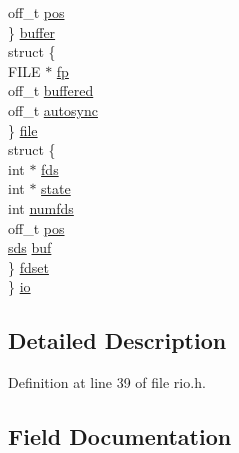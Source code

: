 \begin{DoxyCompactItemize}
\begin{tabbing}
\>\>off\_t \hyperlink{struct__rio_a320b91e58d067b5097a431e6da94f247}{pos}\\
\>\} \hyperlink{struct__rio_a08fd4992ea2a6cc4f1cae2d22475e950}{buffer}\\
\>struct \{\\
\>\>FILE $\ast$ \hyperlink{struct__rio_aa065f30aa9f5f9a42132c82c787ee70b}{fp}\\
\>\>off\_t \hyperlink{struct__rio_aaf9c739870ce662f03414e87c0a3947b}{buffered}\\
\>\>off\_t \hyperlink{struct__rio_a26ab7c3adc5a936bacbe48d501c163f2}{autosync}\\
\>\} \hyperlink{struct__rio_abc0d7429e6b98d70aadb166991f8e5e3}{file}\\
\>struct \{\\
\>\>int $\ast$ \hyperlink{struct__rio_ad259456372b9b7ad374dccd9d0f80eac}{fds}\\
\>\>int $\ast$ \hyperlink{struct__rio_ace50bce9d6e7ed2958418778a6b1711f}{state}\\
\>\>int \hyperlink{struct__rio_a01ef09680a9926f281067248a833e69b}{numfds}\\
\>\>off\_t \hyperlink{struct__rio_a320b91e58d067b5097a431e6da94f247}{pos}\\
\>\>\hyperlink{sds_8h_ad69abac3df4532879db9642c95f5ef6f}{sds} \hyperlink{struct__rio_ae8dd93102163eea99d3d0949d1974628}{buf}\\
\>\} \hyperlink{struct__rio_a5101c27f29f6ce315129e5c9a00f9cc9}{fdset}\\
\} \hyperlink{struct__rio_ad359e2e86f3623eccc8b70ee6f18bc46}{io}\\

\end{tabbing}\end{DoxyCompactItemize}


\subsection{Detailed Description}


Definition at line 39 of file rio.\+h.



\subsection{Field Documentation}
\mbox{\label{struct__rio_a26ab7c3adc5a936bacbe48d501c163f2}} 
